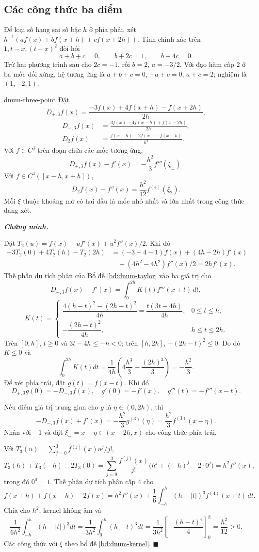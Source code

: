 \documentclass[12pt,a4paper,oneside]{book}
\numberwithin{algorithm}{chapter}
\theoremstyle{definition}
\newenvironment{chungminh}{\par\medskip\noindent\textbf{\textit{\color{mainblue}Chứng minh.}}\ }{\hfill$\blacksquare$\par\medskip}
\begin{document}
\subsection{Các công thức ba điểm}
Để loại số hạng sai số bậc $h$ ở phía phải, xét $h^{-1}(af(x)+bf(x+h)+cf(x+2h))$. Tính chính xác trên $1,t-x,(t-x)^2$ đòi hỏi
\[
 a+b+c=0,\qquad b+2c=1,\qquad b+4c=0.
\]
Trừ hai phương trình sau cho $2c=-1$, rồi $b=2$, $a=-3/2$. Với đạo hàm cấp $2$ ở ba mốc đối xứng, hệ tương ứng là $a+b+c=0$, $-a+c=0$, $a+c=2$; nghiệm là $(1,-2,1)$.
\begin{dinhly}{}{dnum-three-point}
Đặt
\[
 D_{+,3}f(x)=\frac{-3f(x)+4f(x+h)-f(x+2h)}{2h},
\]
\[
\begin{aligned}
 D_{-,3}f(x)&=\frac{3f(x)-4f(x-h)+f(x-2h)}{2h},\\
 D_2f(x)&=\frac{f(x-h)-2f(x)+f(x+h)}{h^2}.
\end{aligned}
\]
Với $f\in C^3$ trên đoạn chứa các mốc tương ứng,
\[
 D_{\pm,3}f(x)-f'(x)=-\frac{h^2}{3}f'''(\xi_\pm).
\]
Với $f\in C^4([x-h,x+h])$,
\[
 D_2f(x)-f''(x)=\frac{h^2}{12}f^{(4)}(\xi_2).
\]
Mỗi $\xi$ thuộc khoảng mở có hai đầu là mốc nhỏ nhất và lớn nhất trong công thức đang xét.
\end{dinhly}
\begin{chungminh}

Đặt $T_2(u)=f(x)+uf'(x)+u^2f''(x)/2$. Khi đó
\begin{align*}
 -3T_2(0)+4T_2(h)-T_2(2h)
 &=(-3+4-1)f(x)+(4h-2h)f'(x)\\
 &\quad+(4h^2-4h^2)f''(x)/2=2hf'(x).
\end{align*}
Thế phần dư tích phân của Bổ đề \ref{bd:dnum-taylor} vào ba giá trị cho
\[
 D_{+,3}f(x)-f'(x)=\int_0^{2h}K(t)f'''(x+t)\,dt,
\]
\[
 K(t)=\begin{cases}
 \dfrac{4(h-t)^2-(2h-t)^2}{4h}=\dfrac{t(3t-4h)}{4h},&0\leq t\leq h,\\[2mm]
 -\dfrac{(2h-t)^2}{4h},&h\leq t\leq2h.
 \end{cases}
\]
Trên $[0,h]$, $t\geq0$ và $3t-4h\leq-h<0$; trên $[h,2h]$, $-(2h-t)^2\leq0$. Do đó $K\leq0$ và
\[
 \int_0^{2h}K(t)dt=\frac1{4h}\left(4\frac{h^3}{3}-\frac{(2h)^3}{3}\right)=-\frac{h^2}{3}.
\]
Để xét phía trái, đặt $g(t)=f(x-t)$. Khi đó
\[
 D_{+,3}g(0)=-D_{-,3}f(x),\quad g'(0)=-f'(x),\quad g'''(t)=-f'''(x-t).
\]

Nếu điểm giá trị trung gian cho $g$ là $\eta\in(0,2h)$, thì
\[
 -D_{-,3}f(x)+f'(x)=-\frac{h^2}{3}g^{(3)}(\eta)
 =\frac{h^2}{3}f^{(3)}(x-\eta).
\]
Nhân với $-1$ và đặt $\xi_-=x-\eta\in(x-2h,x)$ cho công thức phía trái.


Với $T_3(u)=\sum_{j=0}^3f^{(j)}(x)u^j/j!$,
\[
 T_3(h)+T_3(-h)-2T_3(0)
 =\sum_{j=0}^3\frac{f^{(j)}(x)}{j!}\bigl(h^j+(-h)^j-2\cdot0^j\bigr)
 =h^2f''(x),
\]
trong đó $0^0=1$. Thế phần dư tích phân cấp $4$ cho
\[
 f(x+h)+f(x-h)-2f(x)=h^2f''(x)
 +\frac16\int_{-h}^h(h-|t|)^3f^{(4)}(x+t)\,dt.
\]
Chia cho $h^2$; kernel không âm và
\[
 \frac1{6h^2}\int_{-h}^h(h-|t|)^3dt
 =\frac1{3h^2}\int_0^h(h-t)^3dt
 =\frac1{3h^2}\left[-\frac{(h-t)^4}{4}\right]_0^h=\frac{h^2}{12}>0.
\]
Các công thức với $\xi$ theo bổ đề \ref{bd:dnum-kernel}.
\end{chungminh}
\end{document}
